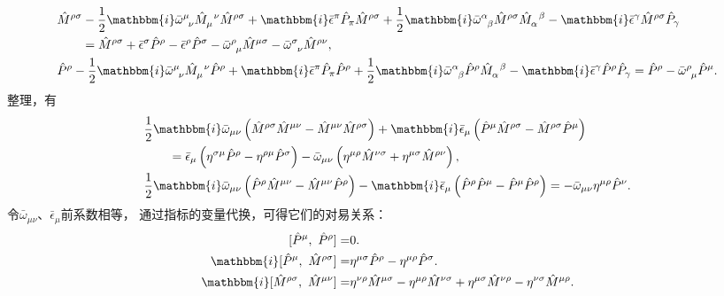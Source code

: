 \begin{align*}
	&\hat{M}^{\rho\sigma}-\frac{1}{2}\mathbbm{i} \bar{\omega}^\mu_{\hphantom{\nu}\nu}
	\hat{M}^{\hphantom{\mu}\nu}_{\mu}\hat{M}^{\rho\sigma}
	+\mathbbm{i}\bar{\epsilon}^{\pi}\hat{P}_{\pi}\hat{M}^{\rho\sigma}
	+\frac{1}{2}\mathbbm{i} \bar{\omega}^\alpha_{\hphantom{\alpha}\beta}
	\hat{M}^{\rho\sigma}\hat{M}^{\hphantom{\alpha}\beta}_{\alpha}
	-\mathbbm{i}\bar{\epsilon}^{\gamma}\hat{M}^{\rho\sigma}\hat{P}_{\gamma}  \\
	&\qquad = \hat{M}^{\rho\sigma} + \bar{\epsilon}^\sigma  \hat{P}^{\rho} - \bar{\epsilon}^\rho  \hat{P}^{\sigma}
	-\bar{\omega}^\rho_{\hphantom{\rho}\mu}\hat{M}^{\mu\sigma}
	-\bar{\omega}^\sigma_{\hphantom{\sigma}\nu} \hat{M}^{\rho\nu}, \\
	&\hat{P}^{\rho}-\frac{1}{2}\mathbbm{i} \bar{\omega}^\mu_{\hphantom{\nu}\nu}
	\hat{M}^{\hphantom{\mu}\nu}_{\mu}\hat{P}^{\rho}+\mathbbm{i}\bar{\epsilon}^{\pi}\hat{P}_{\pi}\hat{P}^{\rho}
	+\frac{1}{2}\mathbbm{i} \bar{\omega}^\alpha_{\hphantom{\alpha}\beta}\hat{P}^{\rho}
	\hat{M}^{\hphantom{\alpha}\beta}_{\alpha}-\mathbbm{i}\bar{\epsilon}^{\gamma}\hat{P}^{\rho}\hat{P}_{\gamma} 
	= \hat{P}^{\rho} -\bar{\omega}^\rho_{\hphantom{\rho}\mu}\hat{P}^{\mu} . 
\end{align*}
整理，有
\begin{align*}
	&\frac{1}{2}\mathbbm{i} \bar{\omega}_{\mu\nu} 
	\left(\hat{M}^{\rho\sigma}\hat{M}^{\mu\nu}- \hat{M}^{\mu\nu}\hat{M}^{\rho\sigma}\right)
	+\mathbbm{i}\bar{\epsilon}_{\mu} \left(\hat{P}^{\mu}\hat{M}^{\rho\sigma}
	-\hat{M}^{\rho\sigma}\hat{P}^{\mu}\right) \\
	&\qquad = \bar{\epsilon}_\mu \left(\eta^{\sigma\mu} \hat{P}^{\rho}-\eta^{\rho\mu} \hat{P}^{\sigma}\right)
	-\bar{\omega}_{\mu\nu}\left(\eta^{\mu\rho}\hat{M}^{\nu\sigma}
	+\eta^{\mu\sigma} \hat{M}^{\rho\nu}\right), \\
	&\frac{1}{2}\mathbbm{i} \bar{\omega}_{\mu\nu}
	\left(\hat{P}^{\rho}\hat{M}^{\mu\nu} - \hat{M}^{\mu\nu}\hat{P}^{\rho}\right)
	-\mathbbm{i}\bar{\epsilon}_{\mu}\left(\hat{P}^{\rho}\hat{P}^{\mu} -\hat{P}^{\mu}\hat{P}^{\rho}\right)
	= -\bar{\omega}_{\mu\nu}\eta^{\mu\rho} \hat{P}^{\nu} . 
\end{align*}
令$\bar{\omega}_{\mu\nu}$、$\bar{\epsilon}_\mu$前系数相等，
通过指标的变量代换，可得它们的对易关系：
\begin{subequations}\label{chlar:eqn_PLA-M}
	\begin{align}
		[\hat{P}^\mu,\ \hat{P}^\rho] = & 0 .\\
		\mathbbm{i} [\hat{P}^\mu,\ \hat{M}^{\rho\sigma}] = & 
		\eta^{\mu \sigma} \hat{P}^\rho-\eta^{\mu \rho} \hat{P}^\sigma .\\
		\mathbbm{i} [\hat{M}^{\rho\sigma},\ \hat{M}^{\mu\nu}] = & 
		\eta^{\nu \rho} \hat{M}^{\mu\sigma}-\eta^{\mu \rho} \hat{M}^{\nu\sigma}
		+\eta^{\mu\sigma} \hat{M}^{\nu\rho}-\eta^{\nu\sigma} \hat{M}^{\mu\rho}.
	\end{align}
\end{subequations}
